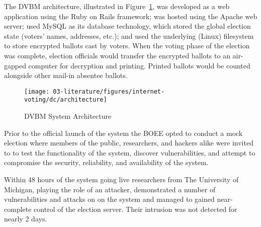 The DVBM architecture, illustrated in Figure~\ref{fig:dvbm-architecture}, was
developed as a web application using the Ruby on Rails framework; was hosted
using the Apache web server; used MySQL as its database technology, which stored
the global election state (voters' names, addresses, etc.); and used the
underlying (Linux) filesystem to store encrypted ballots cast by voters. When
the voting phase of the election was complete, election officials would transfer
the encrypted ballots to an air-gapped computer for decryption and printing.
Printed ballots would be counted alongside other mail-in absentee
ballots.\cite{dc-voting-system}

\begin{figure}[H]
    \centering
    \texttt{[image: 03-literature/figures/internet-voting/dc/architecture]}
    \caption{DVBM System Architecture~\cite{dc-voting-system}}\label{fig:dvbm-architecture}%
\end{figure}

Prior to the official launch of the system the BOEE opted to conduct a mock
election where members of the public, researchers, and hackers alike were
invited to to test the functionality of the system, discover vulnerabilities,
and attempt to compromise the security, reliability, and availability of the
system.\cite{internet-voting-survey,dc-voting-system,trust-the-vote-dc-pilot}

Within 48 hours of the system going live researchers from The University of
Michigan, playing the role of an attacker, demonstrated a number of
vulnerabilities and attacks on on the system and managed to gained near-complete
control of the election server. Their intrusion was not detected for nearly 2
days.\cite{dc-voting-system}

